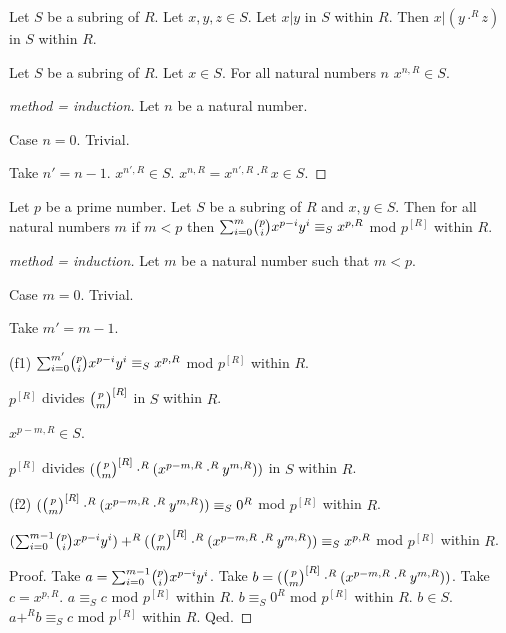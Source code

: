\documentclass[11pt]{article}
\begin{document}
\begin{forthel}

\begin{lemma} Let $S$ be a subring of $R$.
Let $x,y,z \in S$. Let $x | y$ in $S$ within $R$.
Then $x | (y \cdot^{R} z)$ in $S$ within $R$.
\end{lemma}

\begin{lemma} Let $S$ be a subring of $R$.
Let $x \in S$. For all natural numbers $n$
$x^{n,R} \in S$.
\end{lemma}
\begin{proof}[method = induction]
Let $n$ be a natural number.

Case $n=0$. Trivial.

Take $n'=n-1$.
$x^{n',R} \in S$.
$x^{n,R} = x^{n',R} \cdot^{R} x \in S$.
\end{proof}


\begin{lemma} Let $p$ be a prime number.
Let $S$ be a subring of $R$ and $x,y \in S$. 
Then for all natural numbers $m$ if $m < p$ then
$\binsum{m}{p}{x}{y}{R} \equiv_{S} x^{p,R}$ mod $p^{[R]}$ within $R$.
\end{lemma}

\begin{proof}[method = induction]
Let $m$ be a natural number such that $m < p$.

Case $m = 0$. Trivial.

Take $m' = m - 1$.

(f1) $\binsum{m'}{p}{x}{y}{R} \equiv_{S} x^{p,R}$ mod $p^{[R]}$ within $R$.


$p^{[R]}$ divides $\cho{p}{m}^{[R]}$ in $S$ within
$R$.

$x^{p - m,R} \in S$.

$p^{[R]}$ divides $(\cho{p}{m}^{[R]} \cdot^{R} (x^{p - m,R} \cdot^{R} y^{m,R}))$ in $S$ within
$R$.

(f2) $(\cho{p}{m}^{[R]} \cdot^{R} (x^{p - m,R} \cdot^{R} y^{m,R})) \equiv_{S} 0^{R}$ mod $p^{[R]}$ within $R$.




$(\binsum{m-1}{p}{x}{y}{R}) +^{R} (\cho{p}{m}^{[R]} \cdot^{R} (x^{p - m,R} \cdot^{R} y^{m,R}))  
\equiv_{S} x^{p,R}$ mod $p^{[R]}$ within $R$.

Proof.
Take $a = \binsum{m-1}{p}{x}{y}{R}$. 
Take $b = (\cho{p}{m}^{[R]} \cdot^{R} (x^{p - m,R} \cdot^{R} y^{m,R}))$.
Take $c = x^{p,R}$.
$a \equiv_{S} c$ mod $p^{[R]}$ within $R$.
$b \equiv_{S} 0^{R}$ mod $p^{[R]}$ within $R$.
$b \in S$.
$a +^{R} b \equiv_{S} c $ mod $p^{[R]}$ within $R$.
Qed.


\end{proof}
\end{forthel}
\end{document}
